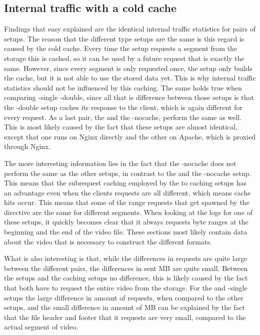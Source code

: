\documentclass[twoside,openright]{uva-bachelor-thesis}
\begin{document}
\subsection{Internal traffic with a cold cache}
Findings that easy explained are the identical internal traffic statistics for
pairs of setups. The reason that the different \cdn type setups are the same is
this regard is caused by the cold cache. Every time the \cdn setup requests a
segment from the storage this is cached, so it can be used by a future request
that is exactly the same. However, since every segment is only requested once,
the \cdn setup only builds the cache, but it is not able to use the stored data
yet. This is why internal traffic statistics should not be influenced by this
caching. The same holds true when comparing \lt-single \lt-double, since all
that is difference between those setups is that the \lt-double setup caches its
response to the client, which is again different for every request. As a last
pair, the \ipp and the \lt-nocache, perform the same as well. This is most
likely caused by the fact that these setups are almost identical, except that
one runs on Nginx directly and the other on Apache, which is proxied through
Nginx.

The more interesting information lies in the fact that the \lt-nocache does not
perform the same as the other \lt setups, in contrast to the \cdn and the
\cdn-nocache setup. This means that the subrequest caching employed by the to
caching \lt setups has an advantage even when the clients requests are all
different, which means cache hits occur. This means that some of the range
requests that get spawned by the \ipp directive are the same for different
segments. When looking at the logs for one of these setups, it quickly becomes
clear that it always requests byte ranges at the beginning and the end of the
video file. These sections most likely contain data about the video that is
necessary to construct the different formats.

What is also interesting is that, while the differences in requests are quite
large between the different pairs, the differences in sent MB are quite small.
Between the \cdn setups and the caching \lt setups no difference, this is likely
caused by the fact that both have to request the entire video from the storage.
For the \ipp and \lt-single setups the large difference in amount of requests,
when compared to the other setups, and the small difference in amount of MB can
be explained by the fact that the file header and footer that it requests are
very small, compared to the actual segment of video.
\end{document}
